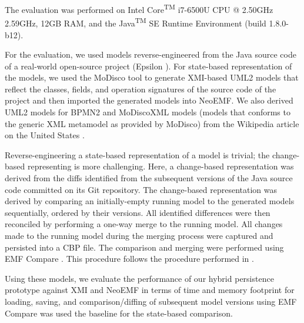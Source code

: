 \documentclass{llncs}
\begin{document}
The evaluation was performed on Intel\textsuperscript{\textregistered} Core\textsuperscript{TM} i7-6500U CPU @ 2.50GHz 2.59GHz, 12GB RAM, and the Java\textsuperscript{TM} SE Runtime Environment (build 1.8.0-b12).

For the evaluation, we used models reverse-engineered from the Java source code of a real-world open-source project (Epsilon \cite{eclipse2017epsilon,eclipse2018epsilongit}). For state-based representation of the models, we used the MoDisco tool \cite{DBLP:journals/infsof/BruneliereCDM14} to generate XMI-based UML2 \cite{eclipse2017uml2} models that reflect the classes, fields, and operation signatures of the source code of the project and then imported the generated models into NeoEMF. We also derived UML2 models for BPMN2 \cite{eclipse2017bpmn2} and MoDiscoXML models (models that conforms to the generic XML metamodel as provided by MoDisco) \cite{eclipse2018modiscoxml} from the Wikipedia article on the United States \cite{wikipedia2018us}. %

Reverse-engineering a state-based representation of a model is trivial; the change-based representing is more challenging. Here, a change-based representation was derived from the diffs identified from the subsequent versions of the Java source code committed on its Git repository. The change-based representation was derived by comparing an initially-empty running model to the generated models sequentially, ordered by their versions. All identified differences were then reconciled by performing a one-way merge to the running model. All changes made to the running model during the merging process were captured and persisted into a CBP file. The comparison and merging were performed using EMF Compare \cite{eclipse2017compare}. This procedure follows the procedure performed in \cite{yohannis2018towards}. %

Using these models, we evaluate the performance of our hybrid persistence prototype against XMI and NeoEMF in terms of time and memory footprint for loading, saving, and comparison/diffing of subsequent model versions using EMF Compare was used the baseline for the state-based comparison. %
\end{document}
